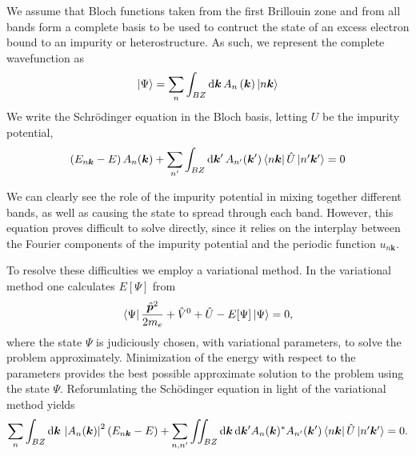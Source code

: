 We assume that Bloch functions taken from the first Brillouin zone and
from all bands form a complete basis to be used to contruct the state
of an excess electron bound to an impurity or heterostructure.  As
such, we represent the complete wavefunction as
\begin{gather}
\textstyle \left| \Psi \right\rangle \displaystyle = \sum_n \int_{BZ} \mathrm{d}\bm{k} \,
A_n\left(\bm{k}\right)\textstyle \left| n\bm{k} \right\rangle \displaystyle
\end{gather}
We write the Schr\"{o}dinger equation in the Bloch basis, letting $U$
be the impurity potential,
\begin{gather}
\left(E_{n\bm{k}} - E\right)A_{n}(\bm{k}) +
\sum_{n^\prime}\int_{BZ}\mathrm{d}\bm{k}^\prime\,A_{n^\prime}(\bm{k}^\prime)\textstyle \left\langle n\bm{k} \right| \displaystyle
\hat{U}\textstyle \left| n^\prime\bm{k}^\prime \right\rangle \displaystyle = 0
\end{gather}

We can clearly see the role of the impurity potential in mixing
together different bands, as well as causing the state to spread
through each band. However, this equation proves difficult to solve
directly, since it relies on the interplay between the Fourier
components of the impurity potential and the periodic function
$u_{n\bm{k}}$.

To resolve these difficulties we employ a variational method. In the
variational method one calculates $E\left[\Psi\right]$ from
\begin{gather}
\textstyle \left\langle \Psi \right| \displaystyle\frac{\hat{\bm{p}}^2}{2 m_e} + \hat{V}^0 + \hat{U} 
- E[\Psi]\textstyle \left| \Psi \right\rangle \displaystyle = 0,
\end{gather}
where the state $\Psi$ is judiciously chosen, with variational
parameters, to solve the problem approximately. Minimization of the
energy with respect to the parameters provides the best possible
approximate solution to the problem using the state
$\Psi$. Reforumlating the Sch\"{o}dinger equation in light of the
variational method yields
\begin{gather}
\sum_{n}\int_{BZ}\mathrm{d}\bm{k}\,\left|A_n(\bm{k})\right|^2
\left(E_{n\bm{k}} - E\right) +
\sum_{n,n^\prime}\iint_{BZ}\mathrm{d}\bm{k}\,\mathrm{d}\bm{k}^\prime
A_{n}(\bm{k})^*A_{n^\prime}(\bm{k}^\prime)\textstyle \left\langle n\bm{k} \right| \displaystyle\hat{U}
\textstyle \left| n^\prime\bm{k}^\prime \right\rangle \displaystyle
=0.
\label{kspacevar}
\end{gather}

